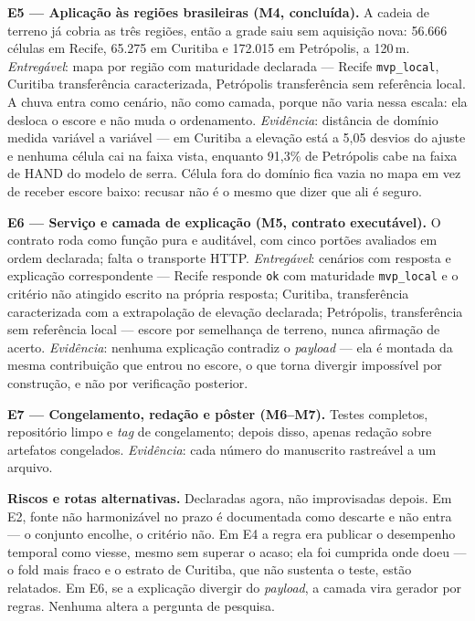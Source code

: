 \documentclass[conference]{IEEEtran}
\begin{document}
\textbf{E5 --- Aplicação às regiões brasileiras (M4, concluída).} A cadeia de
terreno já cobria as três regiões, então a grade saiu sem aquisição nova: 56.666
células em Recife, 65.275 em Curitiba e 172.015 em Petrópolis, a 120\,m.
\emph{Entregável}: mapa por região com maturidade declarada --- Recife
\texttt{mvp\_local}, Curitiba transferência caracterizada, Petrópolis
transferência sem referência local. A chuva entra como cenário, não como camada,
porque não varia nessa escala: ela desloca o escore e não muda o ordenamento.
\emph{Evidência}: distância de domínio medida variável a variável --- em
Curitiba a elevação está a 5,05 desvios do ajuste e nenhuma célula cai na faixa
vista, enquanto 91,3\% de Petrópolis cabe na faixa de HAND do modelo de serra.
Célula fora do domínio fica vazia no mapa em vez de receber escore baixo:
recusar não é o mesmo que dizer que ali é seguro.

\textbf{E6 --- Serviço e camada de explicação (M5, contrato executável).} O
contrato roda como função pura e auditável, com cinco portões avaliados em ordem
declarada; falta o transporte HTTP. \emph{Entregável}: cenários com resposta e
explicação correspondente --- Recife responde \texttt{ok} com maturidade
\texttt{mvp\_local} e o critério não atingido escrito na própria resposta;
Curitiba, transferência caracterizada com a extrapolação de elevação declarada;
Petrópolis, transferência sem referência local --- escore por semelhança de
terreno, nunca afirmação de acerto.
\emph{Evidência}: nenhuma explicação contradiz o \emph{payload} --- ela é montada
da mesma contribuição que entrou no escore, o que torna divergir impossível por
construção, e não por verificação posterior.

\textbf{E7 --- Congelamento, redação e pôster (M6--M7).} Testes completos,
repositório limpo e \emph{tag} de congelamento; depois disso, apenas redação
sobre artefatos congelados. \emph{Evidência}: cada número do manuscrito
rastreável a um arquivo.

\textbf{Riscos e rotas alternativas.} Declaradas agora, não improvisadas depois.
Em E2, fonte não harmonizável no prazo é documentada como descarte e não entra ---
o conjunto encolhe, o critério não. Em E4 a regra era publicar o desempenho
temporal como viesse, mesmo sem superar o acaso; ela foi cumprida onde doeu ---
o fold mais fraco e o estrato de Curitiba, que não sustenta o teste, estão
relatados. Em E6, se a explicação divergir do
\emph{payload}, a camada vira gerador por regras. Nenhuma altera a pergunta de
pesquisa.
\end{document}
